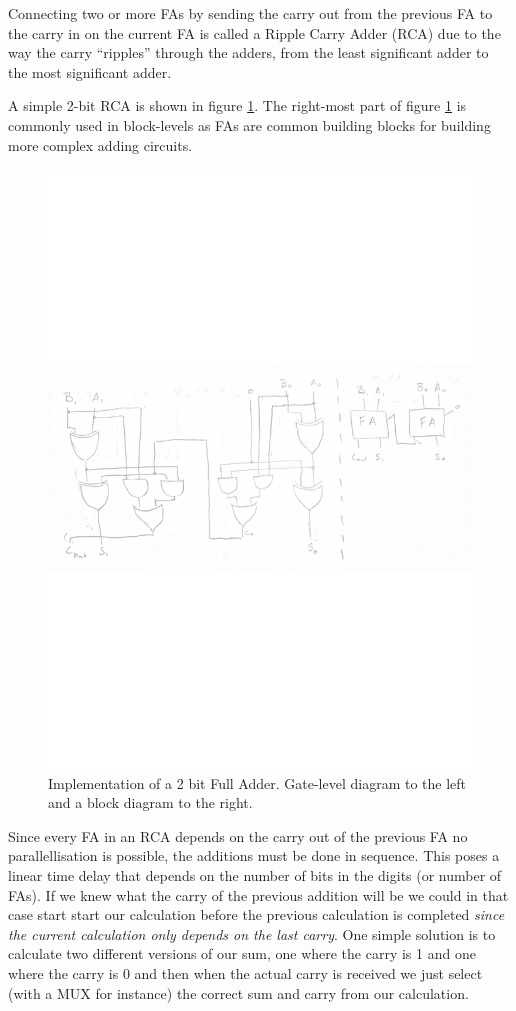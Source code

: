 \documentclass[a4paper,11pt]{report}
\begin{document}
Connecting two or more FAs by sending the carry out from the previous
FA to the carry in on the current FA is called a Ripple Carry Adder
(RCA) due to the way the carry ``ripples'' through the adders, from
the least significant adder to the most significant adder.

A simple 2-bit RCA is shown in figure \ref{fig:2fa}. The right-most
part of figure \ref{fig:2fa} is commonly used in block-levels as FAs
are common building blocks for building more complex adding circuits.

\begin{figure}[H]
  \centering
  \includegraphics[width=.8\textwidth,trim={0 10cm 0 10cm}]{images/2b-FA.pdf}
  \caption{Implementation of a 2 bit Full Adder. Gate-level diagram to the left and a block diagram to the right.}
  \label{fig:2fa}
\end{figure}

Since every FA in an RCA depends on the carry out of the previous FA
no parallellisation is possible, the additions must be done in
sequence. This poses a linear time delay that depends on the number of
bits in the digits (or number of FAs). If we knew what the carry of
the previous addition will be we could in that case start start our
calculation before the previous calculation is completed \textit{since
  the current calculation only depends on the last carry}. One simple
solution is to calculate two different versions of our sum, one where
the carry is 1 and one where the carry is 0 and then when the actual
carry is received we just select (with a MUX for instance) the correct
sum and carry from our calculation.
\end{document}
